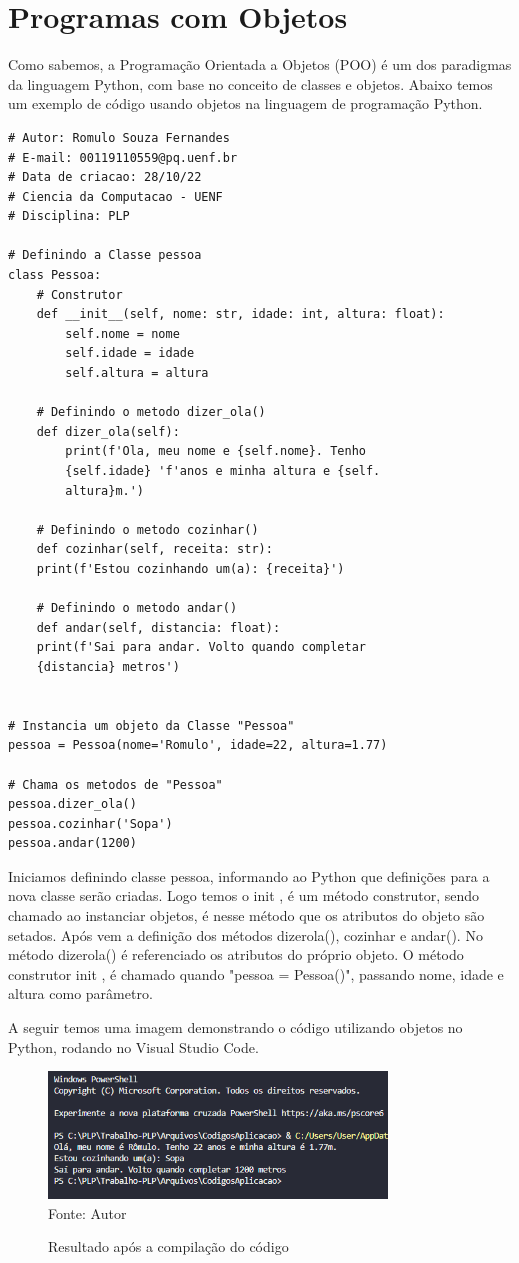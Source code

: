     \section{Programas com Objetos}
    Como sabemos, a Programação Orientada a Objetos (POO) é um dos paradigmas da linguagem
    Python, com base no conceito de classes e objetos. Abaixo temos um exemplo de código usando objetos na linguagem de programação Python.
\begin{lstlisting}
# Autor: Romulo Souza Fernandes
# E-mail: 00119110559@pq.uenf.br
# Data de criacao: 28/10/22
# Ciencia da Computacao - UENF
# Disciplina: PLP

# Definindo a Classe pessoa
class Pessoa:
	# Construtor
	def __init__(self, nome: str, idade: int, altura: float):
		self.nome = nome
		self.idade = idade
		self.altura = altura

	# Definindo o metodo dizer_ola()
	def dizer_ola(self):
		print(f'Ola, meu nome e {self.nome}. Tenho 
		{self.idade} 'f'anos e minha altura e {self.
		altura}m.')

	# Definindo o metodo cozinhar()
	def cozinhar(self, receita: str):
	print(f'Estou cozinhando um(a): {receita}')

	# Definindo o metodo andar()
	def andar(self, distancia: float):
	print(f'Sai para andar. Volto quando completar 
	{distancia} metros')


# Instancia um objeto da Classe "Pessoa"
pessoa = Pessoa(nome='Romulo', idade=22, altura=1.77)

# Chama os metodos de "Pessoa"
pessoa.dizer_ola()
pessoa.cozinhar('Sopa')
pessoa.andar(1200)
\end{lstlisting}
	Iniciamos definindo classe pessoa, informando ao Python que definições para a nova classe serão criadas. Logo temos o \textunderscore\textunderscore init \textunderscore\textunderscore, é um método construtor, sendo chamado ao instanciar objetos, é nesse método que os atributos do objeto são setados. Após vem a definição dos métodos dizer\textunderscore ola(), cozinhar e andar(). No método dizer\textunderscore ola() é referenciado os atributos do próprio objeto. O método construtor \textunderscore\textunderscore init \textunderscore\textunderscore, é chamado quando "pessoa = Pessoa()", passando nome, idade e altura como parâmetro.
	
	A seguir temos uma imagem demonstrando o código utilizando objetos no Python, rodando no Visual Studio Code.
    \begin{figure}[H]
    	\begin{center}
    		\caption{Resultado após a compilação do código} \label{ling1}
    		\includegraphics[width=9cm]{objetos.png} \\
    		{\tiny \sf Fonte:{ Autor}}
    	\end{center}
    \end{figure}
    
